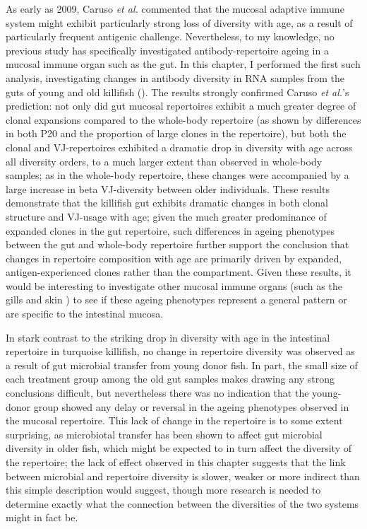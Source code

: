 As early as 2009, Caruso \textit{et al.} \parencite{caruso2009immunosenescence} commented that the mucosal adaptive immune system might exhibit particularly strong loss of diversity with age, as a result of particularly frequent antigenic challenge. Nevertheless, to my knowledge, no previous study has specifically investigated antibody-repertoire ageing in a mucosal immune organ such as the gut. In this chapter, I performed the first such analysis, investigating changes in antibody diversity in RNA samples from the guts of young and old killifish (). The results strongly confirmed Caruso \textit{et al.}'s prediction: not only did gut mucosal repertoires exhibit a much greater degree of clonal expansions compared to the whole-body repertoire (as shown by differences in both P20 and the proportion of large clones in the repertoire), but both the clonal and VJ-repertoires exhibited a dramatic drop in diversity with age across all diversity orders, to a much larger extent than observed in whole-body samples; as in the whole-body repertoire, these changes were accompanied by a large increase in beta VJ-diversity between older individuals. These results demonstrate that the killifish gut exhibits dramatic changes in both clonal structure and VJ-usage with age; given the much greater predominance of expanded clones in the gut repertoire, such differences in ageing phenotypes between the gut and whole-body repertoire further support the conclusion that changes in repertoire composition with age are primarily driven by expanded, antigen-experienced clones rather than the \naive compartment. Given these results, it would be interesting to investigate other mucosal immune organs (such as the gills and skin \parencite{xu2013igtskin}) to see if these ageing phenotypes represent a general pattern or are specific to the intestinal mucosa.

In stark contrast to the striking drop in diversity with age in the intestinal repertoire in turquoise killifish, no change in repertoire diversity was observed as a result of gut microbial transfer from young donor fish. In part, the small size of each treatment group among the old gut samples makes drawing any strong conclusions difficult, but nevertheless there was no indication that the young-donor group showed any delay or reversal in the ageing phenotypes observed in the mucosal repertoire. This lack of change in the repertoire is to some extent surprising, as microbiotal transfer has been shown to affect gut microbial diversity in older fish, which might be expected to in turn affect the diversity of the repertoire; the lack of effect observed in this chapter suggests that the link between microbial and repertoire diversity is slower, weaker or more indirect than this simple description would suggest, though more research is needed to determine exactly what the connection between the diversities of the two systems might in fact be. 

